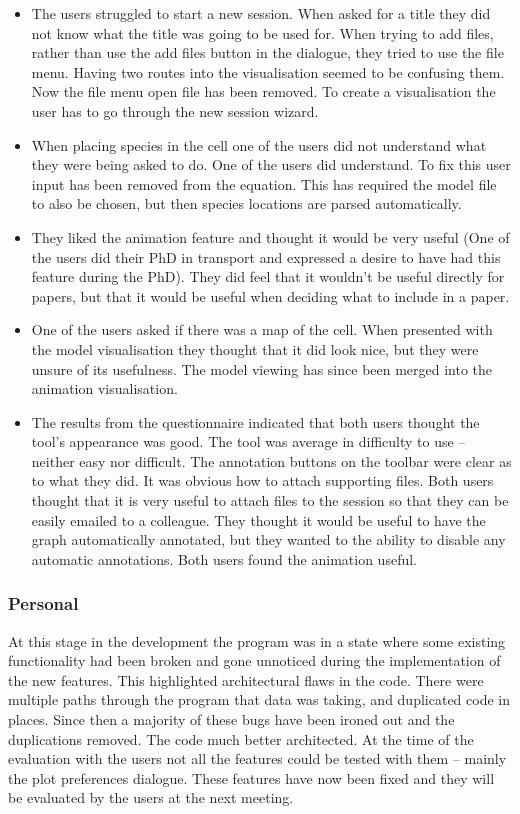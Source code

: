 \begin{itemize}
\item The users struggled to start a new session.  When asked for a title they did not know what the title was going to be used for.  When trying to add files, rather than use the add files button in the dialogue, they tried to use the file menu.  Having two routes into the visualisation seemed to be confusing them.  Now the file menu open file has been removed.  To create a visualisation the user has to go through the new session wizard.
\item When placing species in the cell one of the users did not understand what they were being asked to do.  One of the users did understand.  To fix this user input has been removed from the equation.  This has required the model file to also be chosen, but then species locations are parsed automatically.
\item They liked the animation feature and thought it would be very useful (One of the users did their PhD in transport and expressed a desire to have had this feature during the PhD).  They did feel that it wouldn't be useful directly for papers, but that it would be useful when deciding what to include in a paper.
\item One of the users asked if there was a map of the cell.  When presented with the model visualisation they thought that it did look nice, but they were unsure of its usefulness.  The model viewing has since been merged into the animation visualisation.
\item The results from the questionnaire indicated that both users thought the tool's appearance was good.  The tool was average in difficulty to use -- neither easy nor difficult. The annotation buttons on the toolbar were clear as to what they did. It was obvious how to attach supporting files.  Both users thought that it is very useful to attach files to the session so that they can be easily emailed to a colleague.  They thought it would be useful to have the graph automatically annotated, but they wanted to the ability to disable any automatic annotations.  Both users found the animation useful.
\end{itemize}

\subsubsection{Personal}

At this stage in the development the program was in a state where some existing functionality had been broken and gone unnoticed during the implementation of the new features.  This highlighted architectural flaws in the code.  There were multiple paths through the program that data was taking, and duplicated code in places.  Since then a majority of these bugs have been ironed out and the duplications removed. The code much better architected.  At the time of the evaluation with the users not all the features could be tested with them -- mainly the plot preferences dialogue.  These features have now been fixed and they will be evaluated by the users at the next meeting.

